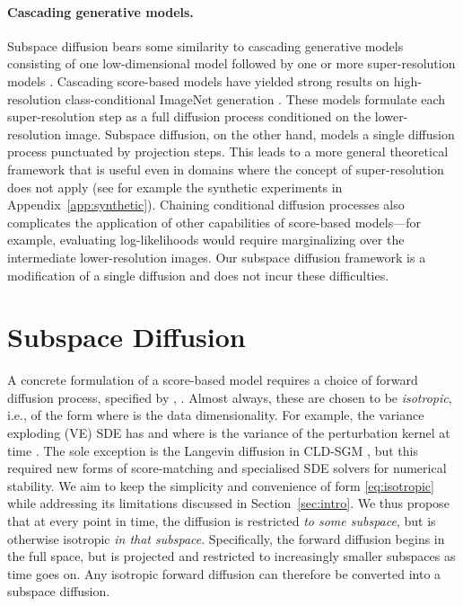\documentclass{article}
\begin{document}
\paragraph{\textbf{Cascading generative models.}} Subspace diffusion bears some similarity to cascading generative models consisting of one low-dimensional model followed by one or more super-resolution models \cite{menick2018generating,razavi2019generating}. Cascading score-based models have yielded strong results on high-resolution class-conditional ImageNet generation \cite{dhariwal2021diffusion,saharia2021image,ho2021cascaded}. These models formulate each super-resolution step as a full diffusion process conditioned on the lower-resolution image. Subspace diffusion, on the other hand, models a single diffusion process punctuated by projection steps. This leads to a more general theoretical framework that is useful even in domains where the concept of super-resolution does not apply (see for example the synthetic experiments in Appendix~\ref{app:synthetic}). Chaining conditional diffusion processes also complicates the application of other capabilities of score-based models---for example, evaluating log-likelihoods would require marginalizing over the intermediate lower-resolution images. Our subspace diffusion framework is a modification of a single diffusion and does not incur these difficulties.

\section{Subspace Diffusion} \label{sec:subspace}
A concrete formulation of a score-based model requires a choice of forward diffusion process, specified by , . Almost always, these are chosen to be \emph{isotropic}, i.e., of the form 
 where  is the data dimensionality. For example, the variance exploding (VE) SDE has  and  where  is the variance of the perturbation kernel at time  \cite{song2021score}. The sole exception is the Langevin diffusion in CLD-SGM \cite{dockhorn2021score}, but this required new forms of score-matching and specialised SDE solvers for numerical stability. We aim to keep the simplicity and convenience of form \eqref{eq:isotropic} while addressing its limitations discussed in Section~\ref{sec:intro}. We thus propose that at every point in time, the diffusion is restricted \emph{to some subspace}, but is otherwise isotropic \emph{in that subspace}. Specifically, the forward diffusion begins in the full space, but is projected and restricted to increasingly smaller subspaces as time goes on. Any isotropic forward diffusion can therefore be converted into a subspace diffusion.
\end{document}
